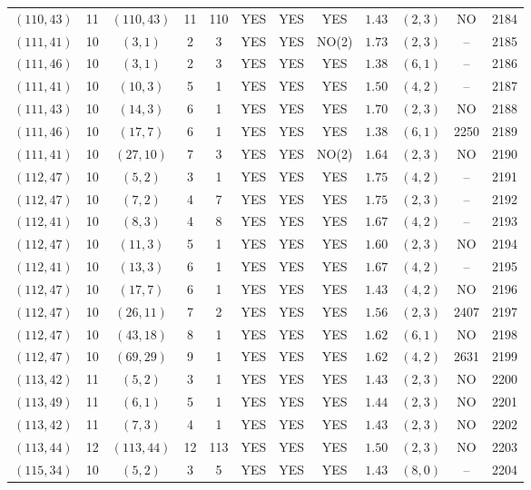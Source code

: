 \begin{longtable}{|c|c|c|c|c|c|c|c|c|c|c|c|}
$(110,43)$ & 11 & $(110,43)$ & 11 & 110 & YES & YES & YES & $1.43$ & $(2,3)$ & NO & 2184\\
$(111,41)$ & 10 & $(3,1)$ & 2 & 3 & YES & YES & NO(2) & $1.73$ & $(2,3)$ & -- & 2185\\
$(111,46)$ & 10 & $(3,1)$ & 2 & 3 & YES & YES & YES & $1.38$ & $(6,1)$ & -- & 2186\\
$(111,41)$ & 10 & $(10,3)$ & 5 & 1 & YES & YES & YES & $1.50$ & $(4,2)$ & -- & 2187\\
$(111,43)$ & 10 & $(14,3)$ & 6 & 1 & YES & YES & YES & $1.70$ & $(2,3)$ & NO & 2188\\
$(111,46)$ & 10 & $(17,7)$ & 6 & 1 & YES & YES & YES & $1.38$ & $(6,1)$ & 2250 & 2189\\
$(111,41)$ & 10 & $(27,10)$ & 7 & 3 & YES & YES & NO(2) & $1.64$ & $(2,3)$ & NO & 2190\\
$(112,47)$ & 10 & $(5,2)$ & 3 & 1 & YES & YES & YES & $1.75$ & $(4,2)$ & -- & 2191\\
$(112,47)$ & 10 & $(7,2)$ & 4 & 7 & YES & YES & YES & $1.75$ & $(2,3)$ & -- & 2192\\
$(112,41)$ & 10 & $(8,3)$ & 4 & 8 & YES & YES & YES & $1.67$ & $(4,2)$ & -- & 2193\\
$(112,47)$ & 10 & $(11,3)$ & 5 & 1 & YES & YES & YES & $1.60$ & $(2,3)$ & NO & 2194\\
$(112,41)$ & 10 & $(13,3)$ & 6 & 1 & YES & YES & YES & $1.67$ & $(4,2)$ & -- & 2195\\
$(112,47)$ & 10 & $(17,7)$ & 6 & 1 & YES & YES & YES & $1.43$ & $(4,2)$ & NO & 2196\\
$(112,47)$ & 10 & $(26,11)$ & 7 & 2 & YES & YES & YES & $1.56$ & $(2,3)$ & 2407 & 2197\\
$(112,47)$ & 10 & $(43,18)$ & 8 & 1 & YES & YES & YES & $1.62$ & $(6,1)$ & NO & 2198\\
$(112,47)$ & 10 & $(69,29)$ & 9 & 1 & YES & YES & YES & $1.62$ & $(4,2)$ & 2631 & 2199\\
$(113,42)$ & 11 & $(5,2)$ & 3 & 1 & YES & YES & YES & $1.43$ & $(2,3)$ & NO & 2200\\
$(113,49)$ & 11 & $(6,1)$ & 5 & 1 & YES & YES & YES & $1.44$ & $(2,3)$ & NO & 2201\\
$(113,42)$ & 11 & $(7,3)$ & 4 & 1 & YES & YES & YES & $1.43$ & $(2,3)$ & NO & 2202\\
$(113,44)$ & 12 & $(113,44)$ & 12 & 113 & YES & YES & YES & $1.50$ & $(2,3)$ & NO & 2203\\
$(115,34)$ & 10 & $(5,2)$ & 3 & 5 & YES & YES & YES & $1.43$ & $(8,0)$ & -- & 2204\\

\end{longtable}
